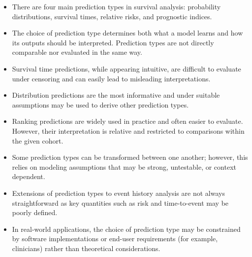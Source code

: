 \documentclass[
  letterpaper,
  krantz2]{style/krantz}
\providecommand{\tightlist}{%
  \setlength{\itemsep}{0pt}\setlength{\parskip}{0pt}}
\begin{document}
\begin{tcolorbox}[enhanced jigsaw, toprule=.15mm, bottomtitle=1mm, opacityback=0, breakable, leftrule=.75mm, title={Key takeaways}, toptitle=1mm, bottomrule=.15mm, colback=white, colframe=quarto-callout-warning-color-frame, titlerule=0mm, opacitybacktitle=0.6, coltitle=black, rightrule=.15mm, left=2mm, colbacktitle=quarto-callout-warning-color!10!white, arc=.35mm]

\begin{itemize}
\tightlist
\item
  There are four main prediction types in survival analysis: probability
  distributions, survival times, relative risks, and prognostic indices.
\item
  The choice of prediction type determines both what a model learns and
  how its outputs should be interpreted. Prediction types are not
  directly comparable nor evaluated in the same way.
\item
  Survival time predictions, while appearing intuitive, are difficult to
  evaluate under censoring and can easily lead to misleading
  interpretations.
\item
  Distribution predictions are the most informative and under suitable
  assumptions may be used to derive other prediction types.
\item
  Ranking predictions are widely used in practice and often easier to
  evaluate. However, their interpretation is relative and restricted to
  comparisons within the given cohort.
\item
  Some prediction types can be transformed between one another; however,
  this relies on modeling assumptions that may be strong, untestable, or
  context dependent.
\item
  Extensions of prediction types to event history analysis are not
  always straightforward as key quantities such as risk and
  time-to-event may be poorly defined.
\item
  In real-world applications, the choice of prediction type may be
  constrained by software implementations or end-user requirements (for
  example, clinicians) rather than theoretical considerations.
\end{itemize}

\end{tcolorbox}
\end{document}
